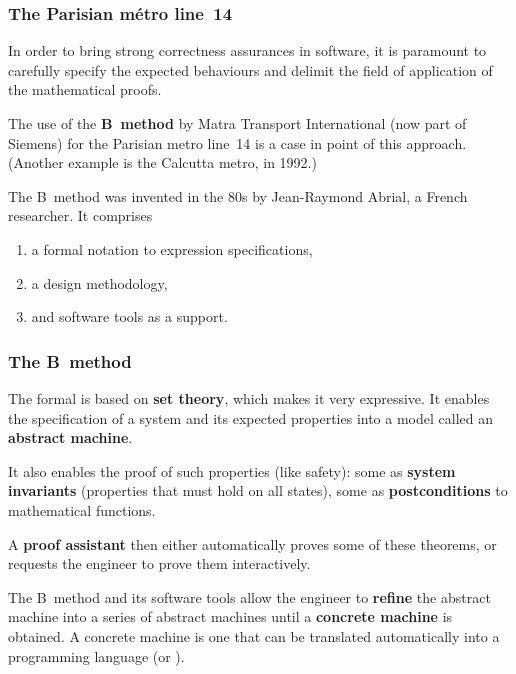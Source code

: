 \documentclass[compress,dvipdfmx]{beamer}
\begin{document}
\begin{frame}
  \frametitle{The Parisian métro line~14}

  In order to bring strong correctness assurances in software, it is
  paramount to carefully specify the expected behaviours and delimit
  the field of application of the mathematical proofs.

  \bigskip

  The use of the \textbf{B~method} by Matra Transport International
  (now part of Siemens) for the Parisian metro line~14 is a case in
  point of this approach. (Another example is the Calcutta metro, in
  1992.)

  \bigskip

   The B~method was invented in the 80s by Jean-Raymond Abrial, a
   French researcher. It comprises
   \begin{enumerate}

     \item a formal notation to expression specifications,

     \item a design methodology,

     \item and software tools as a support.

   \end{enumerate}

\end{frame}


\begin{frame}
  \frametitle{The B~method}

  The formal \textbf{\Blang} is based on \textbf{set theory}, which
  makes it very expressive. It enables the specification of a system
  and its expected properties into a model called an \textbf{abstract
    machine}.

  \bigskip

  It also enables the proof of such properties (like safety): some as
  \textbf{system invariants} (properties that must hold on all
  states), some as \textbf{postconditions} to mathematical functions.

  \bigskip

  A \textbf{proof assistant} then either automatically proves some of
  these theorems, or requests the engineer to prove them
  interactively.

  \bigskip

  The B~method and its software tools allow the engineer to
  \textbf{refine} the abstract machine into a series of abstract
  machines until a \textbf{concrete machine} is obtained. A concrete
  machine is one that can be translated automatically into a
  programming language (\Clang or \Ada).

\end{frame}
\end{document}
